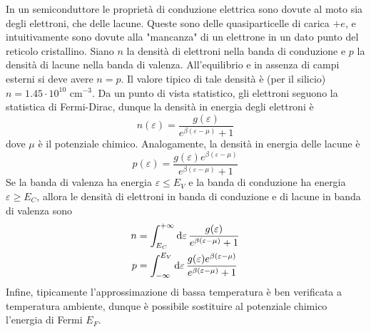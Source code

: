 \documentclass[a4paper, 11pt]{article}
\begin{document}
	In un semiconduttore le proprietà di conduzione elettrica sono dovute al moto sia degli elettroni, che delle lacune. Queste sono delle quasiparticelle di carica $+e$, e intuitivamente sono dovute alla "mancanza" di un elettrone in un dato punto del reticolo cristallino. Siano $n$ la densità di elettroni nella banda di conduzione e $p$ la densità di lacune nella banda di valenza. All'equilibrio e in assenza di campi esterni si deve avere $n=p$. Il valore tipico di tale densità è (per il silicio) $n=1.45\cdot10^{10}$ cm$^{-3}$.
	Da un punto di vista statistico, gli elettroni seguono la statistica di Fermi-Dirac, dunque la densità in energia degli elettroni è
	\[n(\varepsilon)=\frac{g(\varepsilon)}{e^{\beta(\varepsilon-\mu)}+1}\]
	dove $\mu$ è il potenziale chimico. Analogamente, la densità in energia delle lacune è
	\[p(\varepsilon)=\frac{g(\varepsilon)e^{\beta(\varepsilon-\mu)}}{e^{\beta(\varepsilon-\mu)}+1}\]
	Se la banda di valenza ha energia $\varepsilon\leq E_V$ e la banda di conduzione ha energia $\varepsilon\geq E_C$, allora le densità di elettroni in banda di conduzione e di lacune in banda di valenza sono
	\begin{align*}
		n&=\int_{E_C}^{+\infty}\mathrm{d} \varepsilon\,\frac{g(\varepsilon)}{e^{\beta(\varepsilon-\mu)}+1}\\
		p&=\int_{-\infty}^{E_V}\mathrm{d} \varepsilon\,\frac{g(\varepsilon)e^{\beta(\varepsilon-\mu)}}{e^{\beta(\varepsilon-\mu)}+1}
	\end{align*}
	Infine, tipicamente l'approssimazione di bassa temperatura è ben verificata a temperatura ambiente, dunque è possibile sostituire al potenziale chimico l'energia di Fermi $E_F$.
\end{document}
